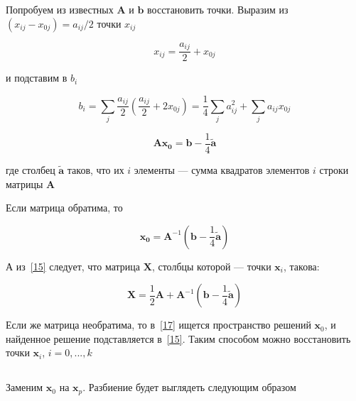 	\subsection{}
	
	Попробуем из известных $\mathbf{A}$ и $\mathbf{b}$ восстановить точки.
	Выразим из $ (x_{ij}-x_{0j}) = a_{ij}/2$ точки $x_{ij}$
	
	\begin{equation}
	\label{15}
	x_{ij} = \frac{a_{ij}}{2} + x_{0j} 
	\end{equation}
	
	и подставим в $b_i$
	
	\begin{equation}
	b_i = \sum_j \frac{a_{ij}}{2}(\frac{a_{ij}}{2} + 2x_{0j}) = \frac14 \sum_j a_{ij}^2 + \sum_j a_{ij} x_{0j}
	\end{equation}
	
	\begin{equation}
	\label{17}
	\mathbf{A} \mathbf{x_0} = \mathbf{b} -  \frac 14  \mathbf{\tilde{a}}
	\end{equation}
	
	где столбец $\mathbf{\tilde{a}}$ таков, что их $i$ элементы --- сумма квадратов элементов $i$ строки матрицы $\mathbf{A}$ 
	
	Если матрица обратима, то
	
	\begin{equation}
	\mathbf{x_0} = \mathbf{A}^{-1} (\mathbf{b} - \frac 14  \mathbf{\tilde{a}})
	\end{equation}
	
	А из~\eqref{15} следует, что матрица $\mathbf{X}$, столбцы которой --- точки $\mathbf{x}_i$, такова:
	
	\begin{equation}
	\mathbf{X} = \frac 12 \mathbf{A} + \mathbf{A}^{-1} (\mathbf{b} - \frac 14  \mathbf{\tilde{a}})
	\end{equation}
	
	Если же матрица необратима, то в~\eqref{17} ищется пространство решений $\mathbf{x}_0$, и найденное решение подставляется в~\eqref{15}. Таким способом можно восстановить точки $\mathbf{x}_i$, $i=0,...,k$
	
	\subsection{}
	
	Заменим $\mathbf{x}_0$ на $\mathbf{x}_p$. Разбиение будет выглядеть следующим образом
	

